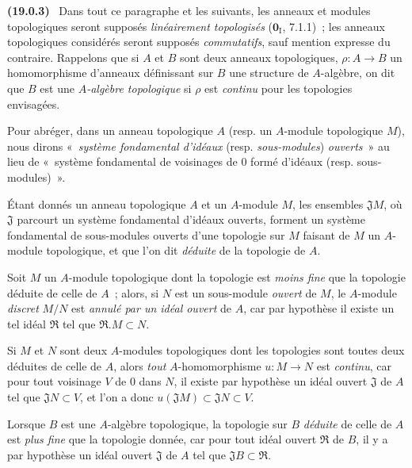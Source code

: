 \documentclass[10pt,oneside]{book}
\makeatletter
\newcommand{\setmanualcurrentlabel}[1]{\def\@currentlabel{#1}}
\newcommand{\oldpage}[2][]{%
  \setcounter{footnote}{0}%
  \marginpar{\scriptsize\textbf{#1}~|~#2}\ignorespaces}
\newenvironment{env}[1][]{\setmanualcurrentlabel{#1}\par\medskip\noindent\textbf{(#1)}\ }{\par}
\makeatother
\begin{document}
\begin{env}[19.0.3]
\label{0.19.0.3-fr}
Dans tout ce paragraphe et les suivants, les anneaux et modules topologiques
seront supposés \emph{linéairement topologisés} ($\mathbf{0}_{\mathrm I}$,
7.1.1)~; les anneaux topologiques considérés seront supposés \emph{commutatifs},
sauf mention expresse du contraire. Rappelons que si $A$ et $B$ sont deux
anneaux topologiques, $\rho:A\to B$ un homomorphisme d'anneaux définissant sur
$B$ une structure de $A$-algèbre, on dit que $B$ est une \emph{$A$-algèbre
topologique} si $\rho$ est \emph{continu} pour les topologies envisagées.

Pour abréger, dans un anneau topologique $A$ (resp. un $A$-module topologique
$M$), nous dirons «~\emph{système fondamental d'idéaux} (resp.
\emph{sous-modules}) \emph{ouverts}~» au lieu de «~système fondamental de
voisinages de 0 formé d'idéaux (resp. sous-modules)~».

Étant donnés un anneau topologique $A$ et un $A$-module $M$, les ensembles
$\mathfrak J M$, où $\mathfrak J$ parcourt un système fondamental d'idéaux
ouverts, forment un système fondamental de sous-modules ouverts d'une topologie
sur $M$ faisant de $M$ un $A$-module topologique, et que l'on dit \emph{déduite}
de la topologie de $A$.

Soit $M$ un $A$-module topologique dont la topologie est \emph{moins fine} que
la topologie déduite de celle de $A$~; alors, si $N$ est un sous-module
\emph{ouvert} de $M$, le $A$-module \emph{discret} $M/N$ est \emph{annulé par
un idéal ouvert} de $A$, car par hypothèse il existe un tel idéal $\mathfrak R$
tel que $\mathfrak R.M\subset N$.

\oldpage[0\textsubscript{IV-1}]{71}

Si $M$ et $N$ sont deux $A$-modules topologiques dont les topologies sont toutes
deux déduites de celle de $A$, alors \emph{tout} $A$-homomorphisme $u:M\to N$
est \emph{continu}, car pour tout voisinage $V$ de 0 dans $N$, il existe par
hypothèse un idéal ouvert $\mathfrak J$ de $A$ tel que $\mathfrak JN\subset V$,
et l'on a donc $u(\mathfrak JM)\subset\mathfrak JN\subset V$.

Lorsque $B$ est une $A$-algèbre topologique, la topologie sur $B$ \emph{déduite}
de celle de $A$ est \emph{plus fine} que la topologie donnée, car pour tout
idéal ouvert $\mathfrak R$ de $B$, il y a par hypothèse un idéal ouvert
$\mathfrak J$ de $A$ tel que $\mathfrak JB\subset\mathfrak R$.
\end{env}
\end{document}
